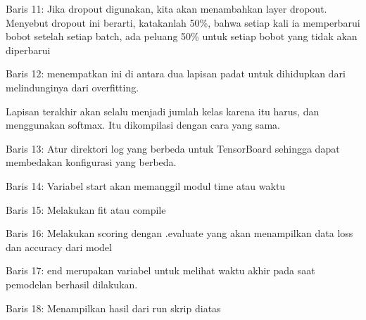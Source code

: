 \begin{enumerate}
\begin{itemize}
\par Baris 11: Jika dropout digunakan, kita akan menambahkan layer dropout. Menyebut dropout ini berarti, katakanlah 50\%, bahwa setiap kali ia memperbarui bobot setelah setiap batch, ada peluang 50\% untuk setiap bobot yang tidak akan diperbarui
\par Baris 12: menempatkan ini di antara dua lapisan padat untuk dihidupkan dari melindunginya dari overfitting.
\par Lapisan terakhir akan selalu menjadi jumlah kelas karena itu harus, dan menggunakan softmax. Itu dikompilasi dengan cara yang sama.
\par Baris 13: Atur direktori log yang berbeda untuk TensorBoard sehingga dapat membedakan konfigurasi yang berbeda.
\par Baris 14: Variabel start akan memanggil modul time atau waktu
\par Baris 15: Melakukan fit atau compile 
\par Baris 16: Melakukan scoring dengan .evaluate yang akan menampilkan data loss dan accuracy dari model
\par Baris 17:  end merupakan variabel untuk melihat waktu akhir pada saat pemodelan berhasil dilakukan.
\par Baris 18:  Menampilkan hasil dari run skrip diatas 
\end{itemize}
\par


\end{enumerate}
